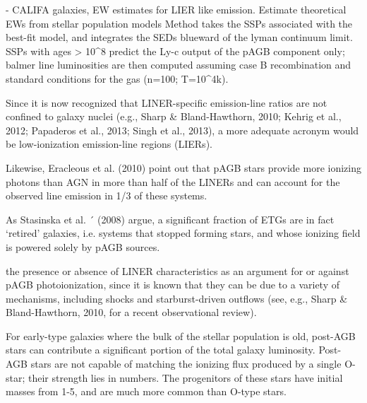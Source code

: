 \citet{Gomes+2016} - CALIFA galaxies, EW estimates for LIER like emission. Estimate theoretical EWs from stellar population models Method takes the SSPs associated with the best-fit model, and integrates the SEDs blueward of the lyman continuum limit. SSPs with ages > 10^8 predict the Ly-c output of the pAGB component only; balmer line luminosities are then computed assuming case B recombination and standard conditions for the gas (n=100; T=10^4k).

 Since it is now recognized that LINER-specific emission-line ratios
are not confined to galaxy nuclei (e.g., Sharp & Bland-Hawthorn,
2010; Kehrig et al., 2012; Papaderos et al., 2013; Singh et al., 2013), a
more adequate acronym would be low-ionization emission-line regions
(LIERs).

Likewise, Eracleous et al. (2010) point
out that pAGB stars provide more ionizing photons than AGN
in more than half of the LINERs and can account for the observed
line emission in 1/3 of these systems. 

As
Stasinska et al. ´ (2008) argue, a significant fraction of ETGs are
in fact ‘retired’ galaxies, i.e. systems that stopped forming stars,
and whose ionizing field is powered solely by pAGB sources.

the presence or
absence of LINER characteristics as an argument for or against
pAGB photoionization, since it is known that they can be due to
a variety of mechanisms, including shocks and starburst-driven
outflows (see, e.g., Sharp & Bland-Hawthorn, 2010, for a recent
observational review).


For early-type galaxies where the bulk of the stellar population is old, post-AGB stars can contribute a significant portion of the total galaxy luminosity. Post-AGB stars are not capable of matching the ionizing flux produced by a single O-star; their strength lies in numbers. The progenitors of these stars have initial masses from 1-5\Msun{}, and are much more common than O-type stars.


